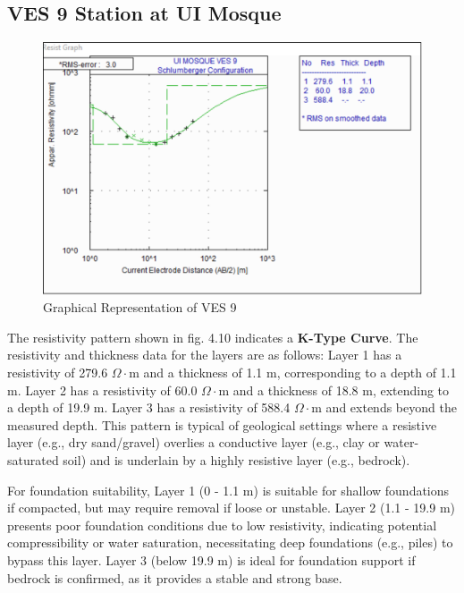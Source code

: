 \documentclass[12pt,a4paper]{report}
\begin{document}
\subsection{VES 9 Station at UI Mosque}

\begin{figure}[H]
    \centering
    \includegraphics[width=1.0\textwidth]{ui_ves9.png}
    \caption{Graphical Representation of VES 9}
    \label{fig:VES_9_Curve}
\end{figure}

The resistivity pattern shown in fig. 4.10 indicates a \textbf{K-Type Curve}. The resistivity and thickness data for the layers are as follows: Layer 1 has a resistivity of 279.6 $\Omega\cdot$m and a thickness of 1.1 m, corresponding to a depth of 1.1 m. Layer 2 has a resistivity of 60.0 $\Omega\cdot$m and a thickness of 18.8 m, extending to a depth of 19.9 m. Layer 3 has a resistivity of 588.4 $\Omega\cdot$m and extends beyond the measured depth. This pattern is typical of geological settings where a resistive layer (e.g., dry sand/gravel) overlies a conductive layer (e.g., clay or water-saturated soil) and is underlain by a highly resistive layer (e.g., bedrock).

For foundation suitability, Layer 1 (0 - 1.1 m) is suitable for shallow foundations if compacted, but may require removal if loose or unstable. Layer 2 (1.1 - 19.9 m) presents poor foundation conditions due to low resistivity, indicating potential compressibility or water saturation, necessitating deep foundations (e.g., piles) to bypass this layer. Layer 3 (below 19.9 m) is ideal for foundation support if bedrock is confirmed, as it provides a stable and strong base.
\end{document}

